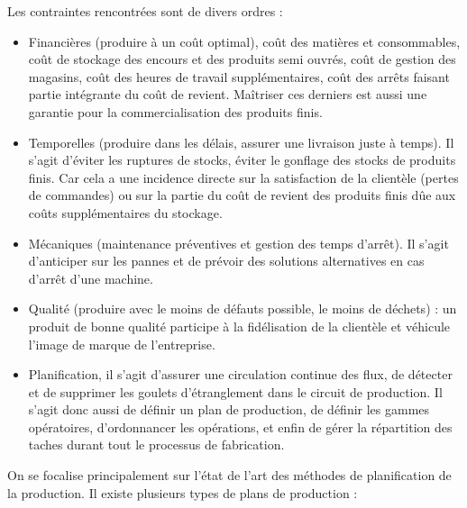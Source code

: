 Les contraintes rencontrées sont de divers ordres :
\begin{itemize}[label=$\square$]%
		
	\item Financières (produire à un coût optimal), coût des matières et consommables, coût de stockage des encours et des produits semi ouvrés, coût de gestion des magasins, coût des heures de travail supplémentaires, coût des arrêts faisant partie intégrante du coût de revient. Maîtriser ces derniers est aussi une garantie pour la commercialisation des produits finis. 
	
	\item Temporelles (produire dans les délais, assurer une livraison juste à temps). Il s'agit d'éviter les ruptures de stocks, éviter le gonflage des stocks de produits finis. Car cela a une incidence directe sur la satisfaction de la clientèle (pertes de commandes) ou sur la partie du coût de revient des produits finis dûe aux coûts supplémentaires du stockage. 
	
	\item Mécaniques (maintenance préventives et gestion des temps d'arrêt). Il s'agit d'anticiper sur les pannes et de prévoir des solutions alternatives en cas d'arrêt d'une machine. 
	
	\item Qualité (produire avec le moins de défauts possible, le moins de déchets) : un produit de bonne qualité participe à la fidélisation de la clientèle et véhicule l'image de marque de l'entreprise. 
	
	\item Planification, il s'agit d'assurer une circulation continue des flux, de détecter et de supprimer les goulets d'étranglement dans le circuit de production. Il s'agit donc aussi de définir un plan de production, de définir les gammes opératoires, d'ordonnancer les opérations, et enfin de gérer la répartition des taches durant tout le processus de fabrication.
	
\end{itemize}
On se focalise principalement sur l'état de l'art des méthodes de planification de la production. Il existe plusieurs types de plans de production :
